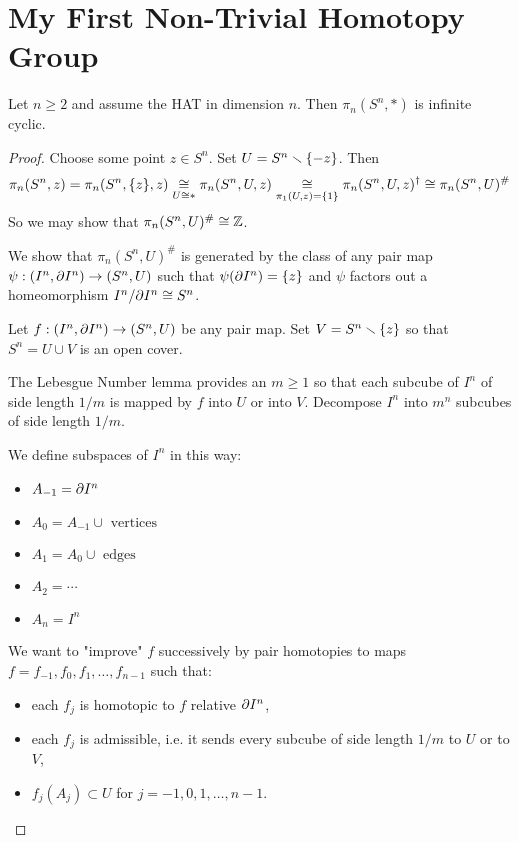 \section{My First Non-Trivial Homotopy Group}

\begin{theorem}
Let $n\geq2$ and assume the HAT in dimension $n$. Then $\pi_n(S^n,*)$ is infinite cyclic.
\end{theorem}

\begin{proof}
Choose some point $z\in S^n$. Set $U=S^n\smallsetminus\{-z\}$. Then \[\pi_n(S^n,z)=\pi_n(S^n,\{z\},z)\underset{U\cong *}{\cong}\pi_n(S^n,U,z)\underset{\pi_1(U,z)=\{1\}}{\cong}\pi_n(S^n,U,z)^\dagger\cong\pi_n(S^n,U)^\#\]
So we may show that $\pi_n(S^n,U)^\#\cong{\mathbb Z}$.

We show that $\pi_n(S^n,U)^\#$ is generated by the class of any pair map $\psi:(I^n,\partial I^n)\to(S^n,U)$ such that $\psi(\partial I^n)=\{z\}$ and $\psi$ factors out a homeomorphism $I^n/\partial I^n\cong S^n$.

Let $f:(I^n,\partial I^n)\to(S^n,U)$ be any pair map. Set $V=S^n\smallsetminus\{z\}$ so that $S^n=U\cup V$ is an open cover.

The Lebesgue Number lemma provides an $m\geq1$ so that each subcube of $I^n$ of side length $1/m$ is mapped by $f$ into $U$ or into $V$. Decompose $I^n$ into $m^n$ subcubes of side length $1/m$.

We define subspaces of $I^n$ in this way:
\begin{itemize}[label=-]
    \item $A_{-1}=\partial I^n$
    \item $A_0=A_{-1}\cup\text{ vertices}$
    \item $A_1=A_0\cup\text{ edges}$
    \item $A_2=\cdots$
    \item $A_n=I^n$
\end{itemize}

We want to "improve" $f$ successively by pair homotopies to maps $f=f_{-1},f_0,f_1,\dots,f_{n-1}$ such that:
\begin{itemize}
    \item each $f_j$ is homotopic to $f$ relative $\partial I^n$,
    \item each $f_j$ is admissible, i.e. it sends every subcube of side length $1/m$ to $U$ or to $V$,
    \item $f_j(A_j)\subset U$ for $j=-1,0,1,\dots,n-1$.
\end{itemize}


\end{proof}
